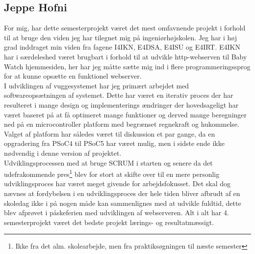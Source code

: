 \subsection*{Jeppe Hofni}
For mig, har dette semesterprojekt været det mest omfavnende projekt i forhold til at bruge den viden jeg har tilegnet mig på ingeniørhøjskolen. Jeg har i høj grad inddraget min viden fra fagene I4IKN, E4DSA, E4ISU og E4IRT. E4IKN har i særdeleshed været brugbart i forhold til at udvikle http-webserven til Baby Watch hjemmesiden, her har jeg måtte sætte mig ind i flere programmeringssprog for at kunne opsætte en funktionel webserver.\\
I udviklingen af vuggesystemet har jeg primært arbejdet med softwareopsætningen af systemet. Dette har været en iterativ proces der har resulteret i mange design og implementerings ændringer der hovedsageligt har været baseret på at få optimeret mange funktioner og derved mange beregninger ned på en microcontroller platform med begrænset regnekraft og hukommelse. Valget af platform har således været til diskussion et par gange, da en opgradering fra PSoC4 til PSoC5 har været mulig, men i sidste ende ikke nødvendig i denne version af projektet.\\
Udviklingsprocessen med at bruge SCRUM i starten og senere da det udefrakommende pres\footnote{Ikke fra det alm. skolearbejde, men fra praktiksøgningen til næste semester} blev for stort at skifte over til en mere personlig udviklingsproces har været meget givende for arbejdsfokusset. Det skal dog nævnes at fordybelsen i en udviklingsproces der hele tiden bliver afbrudt af en skoledag ikke i på nogen måde kan sammenlignes med at udvikle fuldtid, dette blev afprøvet i påskeferien med udviklingen af webserveren. Alt i alt har 4. semesterprojekt været det bedste projekt lærings- og resultatmæssigt.

